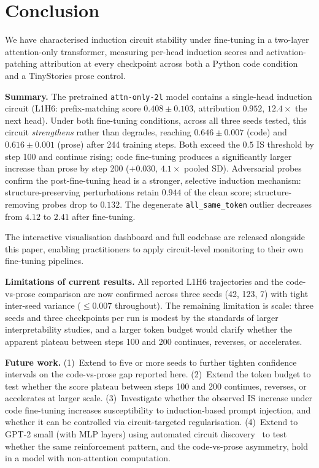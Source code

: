 \section{Conclusion}
\label{sec:conclusion}

We have characterised induction circuit stability under fine-tuning in a
two-layer attention-only transformer, measuring per-head induction scores
and activation-patching attribution at every checkpoint across both a Python
code condition and a TinyStories prose control.

\textbf{Summary.} The pretrained \texttt{attn-only-2l} model contains a
single-head induction circuit (L1H6: prefix-matching score $0.408 \pm 0.103$,
attribution $0.952$, $12.4\times$ the next head). Under both fine-tuning
conditions, across all three seeds tested, this circuit \emph{strengthens}
rather than degrades, reaching $0.646 \pm 0.007$ (code) and
$0.616 \pm 0.001$ (prose) after 244 training steps. Both exceed the $0.5$ IS
threshold by step 100 and continue rising; code fine-tuning produces a
significantly larger increase than prose by step 200
($+0.030$, $4.1\times$ pooled SD). Adversarial probes confirm the
post-fine-tuning head is a stronger, selective induction mechanism:
structure-preserving perturbations retain $0.944$ of the clean score;
structure-removing probes drop to $0.132$. The degenerate
\texttt{all\_same\_token} outlier decreases from $4.12$ to $2.41$ after
fine-tuning.

The interactive visualisation dashboard and full codebase are released
alongside this paper, enabling practitioners to apply circuit-level
monitoring to their own fine-tuning pipelines.

\textbf{Limitations of current results.} All reported L1H6 trajectories
and the code-vs-prose comparison are now confirmed across three seeds (42,
123, 7) with tight inter-seed variance ($\leq 0.007$ throughout). The
remaining limitation is scale: three seeds and three checkpoints per run is
modest by the standards of larger interpretability studies, and a larger
token budget would clarify whether the apparent plateau between steps 100
and 200 continues, reverses, or accelerates.

\textbf{Future work.}
(1)~Extend to five or more seeds to further tighten confidence intervals
on the code-vs-prose gap reported here.
(2)~Extend the token budget to test whether the score plateau between
steps 100 and 200 continues, reverses, or accelerates at larger scale.
(3)~Investigate whether the observed IS increase under code fine-tuning
increases susceptibility to induction-based prompt injection, and whether
it can be controlled via circuit-targeted regularisation.
(4)~Extend to GPT-2 small (with MLP layers) using automated circuit
discovery~\citep{conmy2023automated} to test whether the same reinforcement
pattern, and the code-vs-prose asymmetry, hold in a model with
non-attention computation.
